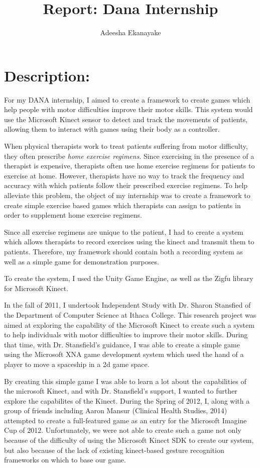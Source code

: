 \documentclass{report}
\author{Adeesha Ekanayake}
\title{Report: Dana Internship}
\begin{document}
\maketitle

\section{Description: }
For my DANA internship, I aimed to create a framework to create games which help people with motor difficulties improve their motor skills. This system would use the Microsoft Kinect sensor to detect and track the movements of patients, allowing them to interact with games using their body as a controller. 

When physical therapists work to treat patients suffering from motor difficulty, they often prescribe \textit{home exercise regimens}. Since exercising in the presence of a therapist is expensive, therapists often use home exercise regimens for patients to exercise at home. However, therapists have no way to track the frequency and accuracy with which patients follow their prescribed exercise regimens. To help alleviate this problem, the object of my internship was to create a framework to create simple exercise based games which therapists can assign to patients in order to supplement home exercise regimens.

Since all exercise regimens are unique to the patient, I had to create a system which allows therapists to record exercises using the kinect and transmit them to patients. Therefore, my framework should contain both a recording system as well as a simple game for demonstration purposes.

To create the system, I used the Unity Game Engine, as well as the Zigfu library for Microsoft Kinect. 

In the fall of 2011, I undertook Independent Study with Dr. Sharon Stansfied of the Department of Computer Science at Ithaca College. This research project was aimed at exploring the capability of the Microsoft Kinect to create such a system to help individuals with motor difficulties to improve their motor skills. During that time, with Dr. Stansfield's guidance, I was able to create a simple game using the Microsoft XNA game development system which used the hand of a player to move a spaceship in a 2d game space. 

By creating this simple game I was able to learn a lot about the capabilities of the microsoft Kinect, and with Dr. Stansfield's support, I wanted to further explore the capabilites of the Kinect. During the Spring of 2012, I, along with a group of friends including Aaron Mansur (Clinical Health Studies, 2014) attempted to create a full-featured game as an entry for the Microsoft Imagine Cup of 2012. Unfortunately, we were not able to create such a game not only because of the difficulty of using the Microsoft Kinect SDK to create our system, but also because of the lack of existing kinect-based gesture recognition frameworks on which to base our game. 
\end{document}
